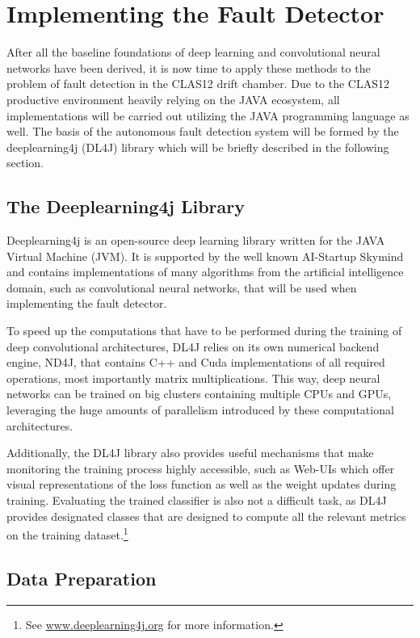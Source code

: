 \chapter{Implementing the Fault Detector}

After all the baseline foundations of deep learning and convolutional
neural networks have been derived, it is now time to apply these
methods to the problem of fault detection in the CLAS12 drift
chamber. Due to the CLAS12 productive environment heavily relying on
the JAVA ecosystem, all implementations will be carried out utilizing
the JAVA programming language as well. The basis of the autonomous
fault detection system will be formed by the deeplearning4j (DL4J)
library which will be briefly described in the following section.

\section{The Deeplearning4j Library}

Deeplearning4j is an open-source deep learning library written for the
JAVA Virtual Machine (JVM). It is supported by the well known
AI-Startup Skymind and contains implementations of many algorithms
from the artificial intelligence domain, such as convolutional neural
networks, that will be used when implementing the fault detector.

To speed up the computations that have to be performed during the
training of deep convolutional architectures, DL4J relies on its own
numerical backend engine, ND4J, that contains C++ and Cuda
implementations of all required operations, most importantly matrix
multiplications. This way, deep neural networks can be trained on
big clusters containing multiple CPUs and GPUs, leveraging the huge
amounts of parallelism introduced by these computational
architectures.

Additionally, the DL4J library also provides useful mechanisms that
make monitoring the training process highly accessible, such as
Web-UIs which offer visual representations of the loss function as
well as the weight updates during training. Evaluating the trained
classifier is also not a difficult task, as DL4J provides
designated classes that are designed to compute all the relevant
metrics on the training dataset.\footnote{See
  \url{www.deeplearning4j.org} for more information.}

\section{Data Preparation}

